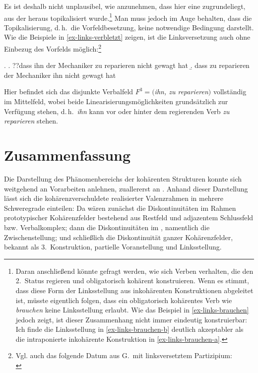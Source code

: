Es ist deshalb nicht unplausibel, wie \citet[238]{Meurers:99} anzunehmen, dass hier eine  zugrundeliegt, aus der heraus topikalisiert wurde.\footnote{Daran anschlie\ss end könnte gefragt werden, wie sich Verben verhalten, die den 2.~Status regieren und obligatorisch kohärent konstruieren. Wenn es stimmt, dass diese Form der Linksstellung aus inkohärenten Konstruktionen abgeleitet ist, müsste eigentlich folgen, dass ein obligatorisch kohärentes Verb wie {\it brauchen} keine Linksstellung erlaubt. Wie das Beispiel in \ref{ex-links-brauchen} jedoch zeigt, ist dieser Zusammenhang nicht immer eindeutig konstruierbar:\\ 
Ich finde die Linksstellung in \ref{ex-links-brauchen-b} deutlich akzeptabler als die intraponierte inkohärente Konstruktion in \ref{ex-links-brauchen-a}.} Man muss jedoch im Auge behalten, dass die Topikalisierung, d.\,h.\ die Vorfeldbesetzung, keine notwendige Bedingung darstellt. Wie die Beispiele in \ref{ex-links-verbletzt} zeigen, ist die Linksversetzung auch ohne Einbezug des Vorfelds möglich:\footnote{Vgl. auch das folgende Datum aus G.\,\cite{GMueller:98} mit linksversetztem Partizipium:\\ 
}     

\ex. \label{ex-links-verbletzt}
\a. ??dass ihn der Mechaniker zu reparieren nicht gewagt hat \label{ex-links-verbletzt-a}
\b. dass zu reparieren der Mechaniker ihn nicht gewagt hat \label{ex-links-verbletzt-b}

Hier befindet sich das disjunkte Verbalfeld $F^3 = (${\it ihn, zu reparieren}$)$ vollständig im Mittelfeld, wobei beide Linearisierungsmöglichkeiten grundsätzlich zur Verfügung stehen, d.\,h.\ {\it ihn} kann vor oder hinter dem regierenden Verb {\it zu reparieren}  stehen.


\section{Zusammenfassung}

Die Darstellung des Phänomenbereichs der kohärenten Strukturen konnte sich weitgehend an Vorarbeiten anlehnen, zuallererst an \cite{Bech:55}. Anhand dieser Darstellung lässt sich die kohärenzverschuldete  realisierter Valenzrahmen in mehrere Schweregrade einteilen: Da wären zunächst die Diskontinuitäten im Rahmen prototypischer Kohärenzfelder bestehend aus Restfeld und adjazentem Schlussfeld bzw. Verbalkomplex; dann die Diskontinuitäten im , namentlich die Zwischenstellung; und schlie\ss lich die Diskontinuität ganzer Kohärenzfelder, bekannt als 3.~Konstruktion, partielle Voranstellung und Linksstellung.  

